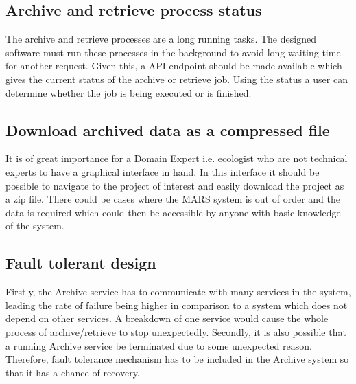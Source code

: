         \subsection{Archive and retrieve process status}  
            The archive and retrieve processes are a long running tasks. The designed software must run these processes in the background to avoid 
            long waiting time for another request. Given this, a API endpoint should be made available which gives the current status of the archive 
            or retrieve job. Using the status a user can determine whether the job is being executed or is finished.


        \subsection{Download archived data as a compressed file}
            It is of great importance for a Domain Expert i.e. ecologist who are not technical experts to have a graphical interface in hand. In this interface
            it should be possible to navigate to the project of interest and easily download the project as a zip file. There could be cases where the
            MARS system is out of order and the data is required which could then be accessible by anyone with basic knowledge of the system.
        
        \subsection{Fault tolerant design}   
        Firstly, the Archive service has to communicate with many services in the system, leading the rate of failure being higher
        in comparison to a system which does not depend on other services. A breakdown 
        of one service would cause the whole process of archive/retrieve to stop unexpectedly.  Secondly, it is also possible that a running Archive service be terminated
        due to some unexpected reason. Therefore, fault tolerance mechanism has to be included in the Archive system so that it has a chance of 
        recovery. 
